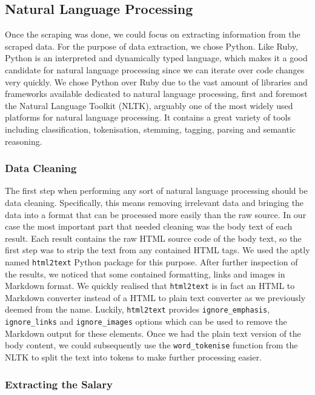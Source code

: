 \documentclass[runningheads]{llncs}
\begin{document}
\subsection{Natural Language Processing}
\label{sub:natural_language_processing}

Once the scraping was done, we could focus on extracting information from the scraped data. For the purpose of data extraction, we chose Python. Like Ruby, Python is an interpreted and dynamically typed language, which makes it a good candidate for natural language processing since we can iterate over code changes very quickly. We chose Python over Ruby due to the vast amount of libraries and frameworks available dedicated to natural language processing, first and foremost the Natural Language Toolkit (NLTK), arguably one of the most widely used platforms for natural language processing. It contains a great variety of tools including classification, tokenisation, stemming, tagging, parsing and semantic reasoning. \cite{nltk}

\subsubsection{Data Cleaning}
\label{subsub:data_cleaning}

The first step when performing any sort of natural language processing should be data cleaning. Specifically, this means removing irrelevant data and bringing the data into a format that can be processed more easily than the raw source. In our case the most important part that needed cleaning was the body text of each result. Each result contains the raw HTML source code of the body text, so the first step was to strip the text from any contained HTML tags. We used the aptly named \texttt{html2text} Python package for this purpose. After further inspection of the results, we noticed that some contained formatting, links and images in Markdown format. We quickly realised that \texttt{html2text} is in fact an HTML to Markdown converter instead of a HTML to plain text converter as we previously deemed from the name. Luckily, \texttt{html2text} provides \texttt{ignore\_emphasis}, \texttt{ignore\_links} and \texttt{ignore\_images} options which can be used to remove the Markdown output for these elements. Once we had the plain text version of the body content, we could subsequently use the \texttt{word\_tokenise} function from the NLTK to split the text into tokens to make further processing easier.

\subsubsection{Extracting the Salary}
\label{subsub:extracting_the_salary}
\end{document}
